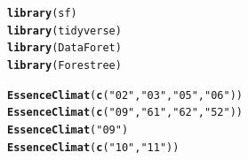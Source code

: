 \documentclass{article}\usepackage[]{graphicx}\usepackage[]{color}
\makeatletter
\newcommand{\hlstr}[1]{\textcolor[rgb]{0.192,0.494,0.8}{#1}}%
\newcommand{\hlstd}[1]{\textcolor[rgb]{0.345,0.345,0.345}{#1}}%
\newcommand{\hlkwd}[1]{\textcolor[rgb]{0.737,0.353,0.396}{\textbf{#1}}}%
\newenvironment{kframe}{%
 \def\at@end@of@kframe{}%
 \ifinner\ifhmode%
  \def\at@end@of@kframe{\end{minipage}}%
  \begin{minipage}{\columnwidth}%
 \fi\fi%
 \def\FrameCommand##1{\hskip\@totalleftmargin \hskip-\fboxsep
 \colorbox{shadecolor}{##1}\hskip-\fboxsep
     \hskip-\linewidth \hskip-\@totalleftmargin \hskip\columnwidth}%
 \MakeFramed {\advance\hsize-\width
   \@totalleftmargin\z@ \linewidth\hsize
   \@setminipage}}%
 {\par\unskip\endMakeFramed%
 \at@end@of@kframe}
\newenvironment{knitrout}{}{} %
\makeatother
\begin{document}
\begin{knitrout}\small
{}\color{fgcolor}\begin{kframe}
\begin{alltt}
\hlkwd{library}\hlstd{(sf)}
\hlkwd{library}\hlstd{(tidyverse)}
\hlkwd{library}\hlstd{(DataForet)}
\hlkwd{library}\hlstd{(Forestree)}

\hlkwd{EssenceClimat}\hlstd{(}\hlkwd{c}\hlstd{(}\hlstr{"02"}\hlstd{,}\hlstr{"03"}\hlstd{,}\hlstr{"05"}\hlstd{,}\hlstr{"06"}\hlstd{))}
\hlkwd{EssenceClimat}\hlstd{(}\hlkwd{c}\hlstd{(}\hlstr{"09"}\hlstd{,}\hlstr{"61"}\hlstd{,}\hlstr{"62"}\hlstd{,}\hlstr{"52"}\hlstd{))}
\hlkwd{EssenceClimat}\hlstd{(}\hlstr{"09"}\hlstd{)}
\hlkwd{EssenceClimat}\hlstd{(}\hlkwd{c}\hlstd{(}\hlstr{"10"}\hlstd{,}\hlstr{"11"}\hlstd{))}
\end{alltt}
\end{kframe}
\end{knitrout}
\end{document}
